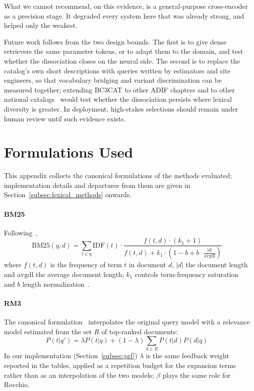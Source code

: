 \documentclass[preprint,review,12pt]{elsarticle}
\begin{document}
What we cannot recommend, on this evidence, is a general-purpose cross-encoder as a precision stage. It degraded every system here that was already strong, and helped only the weakest.

Future work follows from the two design bounds. The first is to give dense retrievers the same parameter tokens, or to adapt them to the domain, and test whether the dissociation closes on the neural side. The second is to replace the catalog's own short descriptions with queries written by estimators and site engineers, so that vocabulary bridging and variant discrimination can be measured together; extending BC3CAT to other ADIF chapters and to other national catalogs~\cite{royanoAnalysisClassificationSystems2023a} would test whether the dissociation persists where lexical diversity is greater. In deployment, high-stakes selections should remain under human review until such evidence exists.

\appendix

\section{Formulations Used}
\label{app:technical-background}

This appendix collects the canonical formulations of the methods evaluated; implementation details and departures from them are given in Section~\ref{subsec:lexical_methods} onwards.

\paragraph{BM25} Following~\cite{robertson2009probabilistic},
\begin{equation}
\text{BM25}(q,d) = \sum_{t \in q} \text{IDF}(t) \cdot \frac{f(t,d) \cdot (k_1 + 1)}{f(t,d) + k_1 \cdot (1 - b + b \cdot \frac{|d|}{\text{avgdl}})}
\end{equation}
where $f(t,d)$ is the frequency of term $t$ in document $d$, $|d|$ the document length and $\text{avgdl}$ the average document length; $k_1$ controls term-frequency saturation and $b$ length normalization~\cite{trotmanImprovementsBM25Language2014}.

\paragraph{RM3} The canonical formulation~\cite{abdul2004umass} interpolates the original query model with a relevance model estimated from the set $R$ of top-ranked documents:
\begin{equation}
P(t|q') = \lambda P(t|q) + (1-\lambda) \sum_{d \in R} P(t|d) P(d|q)
\end{equation}
In our implementation (Section~\ref{subsec:prf}) $\lambda$ is the same feedback weight reported in the tables, applied as a repetition budget for the expansion terms rather than as an interpolation of the two models; $\beta$ plays the same role for Rocchio.
\end{document}
